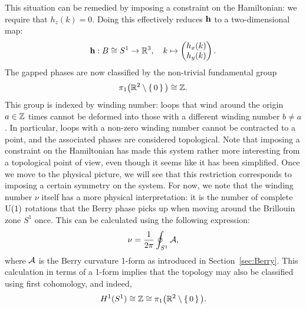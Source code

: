 This situation can be remedied by imposing a constraint on the Hamiltonian: we require that $h_z(k)=0$. Doing this effectively reduces $\vb{h}$ to a two-dimensional map:
\[
	\vb{h}: B\cong S^1\to\mathbb{R}^3,\quad k\mapsto\begin{pmatrix}
		h_x(k) \\ h_y(k)
	\end{pmatrix}.
\]
The gapped phases are now classified by the non-trivial fundamental group
\begin{equation*}
\pi_1\big(\mathbb{R}^2\setminus\set{0}\big)\cong\mathbb{Z}.
\end{equation*}
This group is indexed by winding number: loops that wind around the origin $a\in\mathbb{Z}$ times cannot be deformed into those with a different winding number $b\neq a$. In particular, loops with a non-zero winding number cannot be contracted to a point, and the associated phases are considered topological. Note that imposing a constraint on the Hamiltonian has made this system rather more interesting from a topological point of view, even though it seems like it has been simplified. Once we move to the physical picture, we will see that this restriction corresponds to imposing a certain symmetry on the system. For now, we note that the winding number $\nu$ itself has a more physical interpretation: it is the number of complete $\operatorname{U}(1)$ rotations that the Berry phase picks up when moving around the Brillouin zone $S^1$ once. This can be calculated using the following expression:
\begin{equation}\label{eq:SSH-Berry}
	\nu = \frac{1}{2\pi}\oint_{S^1}\mathcal{A},
\end{equation}
where $\mathcal{A}$ is the Berry curvature 1-form as introduced in Section~\ref{sec:Berry}. This calculation in terms of a 1-form implies that the topology may also be classified using first cohomology, and indeed,
\begin{equation*}
	H^1(S^1) \cong \mathbb{Z} \cong \pi_1\big(\mathbb{R}^2\setminus\set{0}\big).
\end{equation*}

